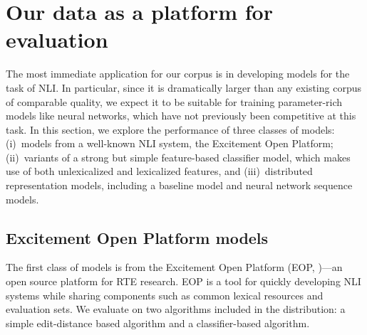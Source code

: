 \section{Our data as a platform for evaluation}

The most immediate application for our corpus is in developing models for the task of NLI\@. In particular, since it is dramatically larger than any existing corpus of comparable quality, we expect it to be suitable for training parameter-rich models like neural networks, which have not previously been competitive at this task. In this section, we explore the performance of three classes of models: (i)~models from a well-known NLI system, the Excitement Open Platform; (ii)~variants of a strong but simple feature-based classifier model, which makes use of both unlexicalized and lexicalized features, and (iii)~distributed representation models, including a baseline model and neural network sequence models.

%
%

\subsection{Excitement Open Platform models}

The first class of models is from the Excitement Open
  Platform (EOP,
  \citealt{pado2014design,magnini2014excitement})---an open source platform for RTE research.
%
EOP is a tool for quickly developing NLI systems
  while sharing components such as common lexical resources and 
  evaluation sets.
We evaluate on two algorithms included in the distribution:
  a simple edit-distance based algorithm and
  a classifier-based algorithm.

